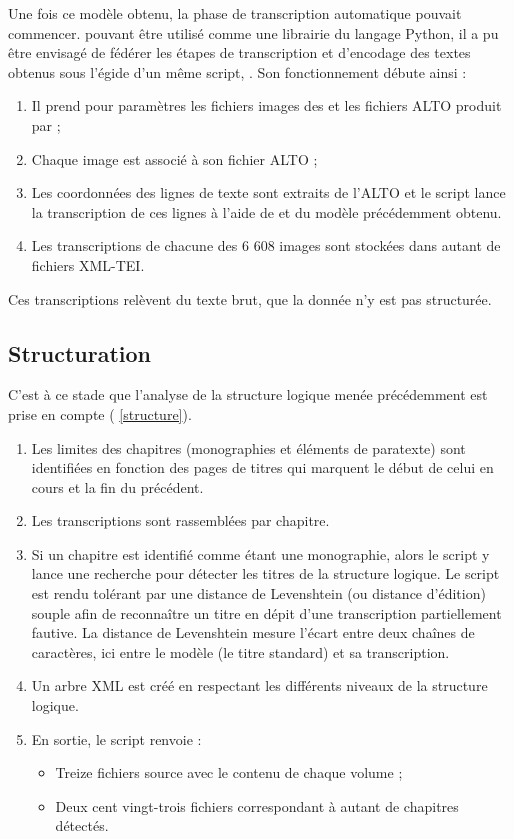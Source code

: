Une fois ce modèle obtenu, la phase de transcription automatique pouvait commencer. \kraken{} pouvant être utilisé comme une librairie du langage Python, il a pu être envisagé de fédérer les étapes de transcription et d'encodage des textes obtenus sous l'égide d'un même script, \lse. Son fonctionnement débute ainsi :

\begin{enumerate}
    \item Il prend pour paramètres les fichiers images des \odm{} et les fichiers ALTO produit par \transkribus ;
    \item Chaque image est associé à son fichier ALTO ;
    \item Les coordonnées des lignes de texte sont extraits de l'ALTO et le script lance la transcription de ces lignes à l'aide de \kraken{} et du modèle précédemment obtenu.
    \item Les transcriptions de chacune des 6 608 images sont stockées dans autant de fichiers XML-TEI.
\end{enumerate}

Ces transcriptions relèvent du texte brut, \cad{} que la donnée n'y est pas structurée.

\subsection{Structuration}

C'est à ce stade que l'analyse de la structure logique menée précédemment est prise en compte (\ann{} \ref{structure}).

\begin{enumerate}
    \item Les limites des chapitres (monographies et éléments de paratexte) sont identifiées en fonction des pages de titres qui marquent le début de celui en cours et la fin du précédent.
    \item Les transcriptions sont rassemblées par chapitre.
    \item Si un chapitre est identifié comme étant une monographie, alors le script y lance une recherche pour détecter les titres de la structure logique. Le script est rendu tolérant par une distance de Levenshtein (ou distance d'édition) souple afin de reconnaître un titre en dépit d'une transcription partiellement fautive. La distance de Levenshtein mesure l'écart entre deux chaînes de caractères, ici entre le modèle (le titre standard) et sa transcription.
    \item Un arbre XML est créé en respectant les différents niveaux de la structure logique.
    \item En sortie, le script renvoie :
    \begin{itemize}
        \item Treize fichiers \og source \fg{} avec le contenu de chaque volume ;
        \item Deux cent vingt-trois fichiers correspondant à autant de chapitres détectés.
    \end{itemize}
\end{enumerate}

